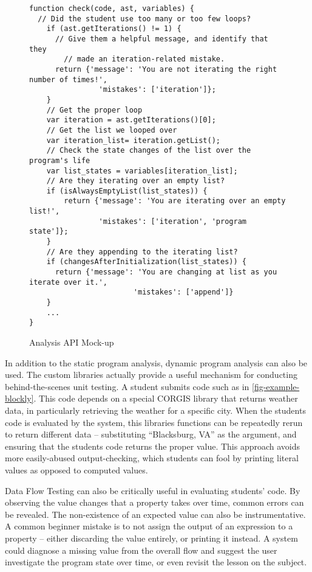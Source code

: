 \begin{figure*}[ht]
\begin{lstlisting}[columns=fullflexible]
function check(code, ast, variables) {
  // Did the student use too many or too few loops?
	if (ast.getIterations() != 1) {
	  // Give them a helpful message, and identify that they
		// made an iteration-related mistake.
	  return {'message': 'You are not iterating the right number of times!',
		        'mistakes': ['iteration']};
	}
	// Get the proper loop
	var iteration = ast.getIterations()[0];
	// Get the list we looped over
	var iteration_list= iteration.getList();
	// Check the state changes of the list over the program's life
	var list_states = variables[iteration_list];
	// Are they iterating over an empty list?
	if (isAlwaysEmptyList(list_states)) {
		return {'message': 'You are iterating over an empty list!',
		        'mistakes': ['iteration', 'program state']};
	}
	// Are they appending to the iterating list?
	if (changesAfterInitialization(list_states)) {
	  return {'message': 'You are changing at list as you iterate over it.',
						'mistakes': ['append']}
	}
	...
}
\end{lstlisting}
\caption{Analysis API Mock-up}
\label{fig-example-analysis}
\end{figure*}

In addition to the static program analysis, dynamic program analysis can also be used.
The custom libraries actually provide a useful mechanism for conducting behind-the-scenes unit testing.
A student submits code such as in \ref{fig-example-blockly}.
This code depends on a special CORGIS library that returns weather data, in particularly retrieving the weather for a specific city.
When the students code is evaluated by the system, this libraries functions can be repeatedly rerun to return different data -- substituting ``Blacksburg, VA'' as the argument, and ensuring that the students code returns the proper value.
This approach avoids more easily-abused output-checking, which students can fool by printing literal values as opposed to computed values.

Data Flow Testing can also be critically useful in evaluating students' code.
By observing the value changes that a property takes over time, common errors can be revealed.
The non-existence of an expected value can also be instrumentative.
A common beginner mistake is to not assign the output of an expression to a property -- either discarding the value entirely, or printing it instead.
A system could diagnose a missing value from the overall flow and suggest the user investigate the program state over time, or even revisit the lesson on the subject.

